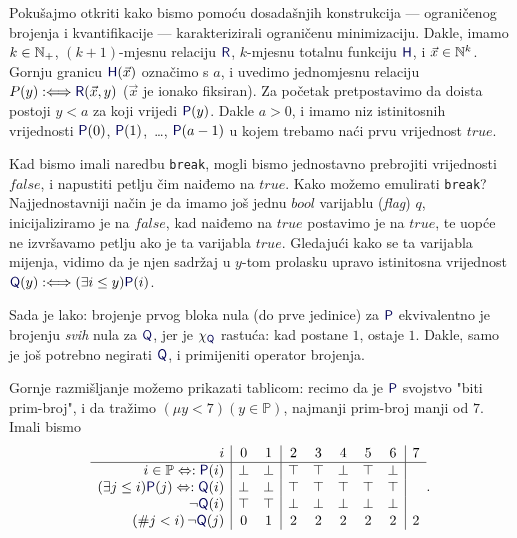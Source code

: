 
Pokušajmo otkriti kako bismo pomoću dosadašnjih konstrukcija --- ograničenog brojenja i kvantifikacije --- karakterizirali ograničenu minimizaciju. Dakle, imamo $k\in{\mathbb N}_+$, $(k+1)$-mjesnu relaciju $\f R$, $k$-mjesnu totalnu funkciju $\f H$, i $\vec x\in{\mathbb N}^k$. Gornju granicu $\f H(\vec x)$ označimo s $a$, i uvedimo jednomjesnu relaciju $P(y):\Longleftrightarrow\f R(\vec x,y)$ ($\vec x$ je ionako fiksiran). Za početak pretpostavimo da doista postoji $y<a$ za koji vrijedi $\f P(y)$. Dakle $a>0$, i imamo niz istinitosnih vrijednosti $\f P(0)$, $\f P(1)$,~\ldots, $\f P(a-1)$ u kojem trebamo naći prvu vrijednost $\mathit{true}$.

Kad bismo imali naredbu \texttt{break}, mogli bismo jednostavno prebrojiti vrijednosti $\mathit{false}$, i napustiti petlju čim naiđemo na $\mathit{true}$. Kako možemo emulirati \texttt{break}? Najjednostavniji način je da imamo još jednu $bool$ varijablu (\emph{flag}) $q$, inicijaliziramo je na $\mathit{false}$, kad naiđemo na $\mathit{true}$ postavimo je na $\mathit{true}$, te uopće ne izvršavamo petlju ako je ta varijabla $\mathit{true}$. Gledajući kako se ta varijabla mijenja, vidimo da je njen sadržaj u $y$-tom prolasku upravo istinitosna vrijednost $\f Q(y):\Longleftrightarrow(\exists i\le y)\f P(i)$.

Sada je lako: brojenje prvog bloka nula (do prve jedinice) za $\f P$ ekvivalentno je brojenju \emph{svih} nula za $\f Q$, jer je $\chi_{\f Q}$ rastuća: kad postane $1$, ostaje $1$. Dakle, samo je još potrebno negirati $\f Q$, i primijeniti operator brojenja.

Gornje razmišljanje možemo prikazati tablicom: recimo da je $\f P$ svojstvo "biti prim-broj", i da tražimo $(\mu y<7)(y\in\mathbb P)$, najmanji prim-broj manji od $7$. Imali bismo
\begin{equation}
    \begin{array}{r|cc|ccccc|c}
i & 0 & 1 & 2 & 3 & 4 & 5 & 6 & 7 \\\hline
i\in\mathbb P\Leftrightarrow:\f P(i) & \bot & \bot & \top & \top & \bot & \top & \bot  \\
(\exists j\le i)\f P(j)\Leftrightarrow:\f Q(i) & \bot & \bot & \top & \top & \top & \top & \top \\
\lnot\f Q(i) & \top & \top & \bot & \bot & \bot & \bot & \bot\\
(\# j<i)\,\lnot\f Q(j) & 0 & 1 & 2 & 2 & 2 & 2 & 2 & 2
\end{array}\text.
\end{equation}


